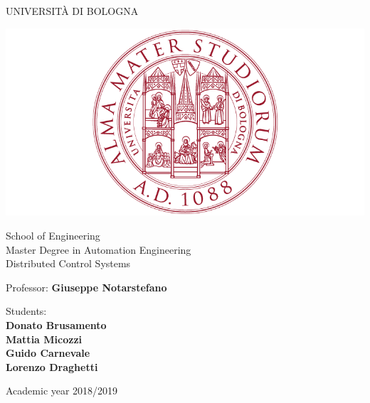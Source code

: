 \documentclass[a4paper,11pt,oneside]{book}
\begin{document}
	\pagestyle{myheadings}
	
	\thispagestyle{empty}                                                 
	\begin{center}                                                            
		\vspace{5mm}
		{\LARGE UNIVERSIT\`A DI BOLOGNA} \\                       
		\vspace{5mm}
	\end{center}
	\begin{center}
		\includegraphics[scale=.27]{figs/logo_unibo}
	\end{center}
	\begin{center}
		\vspace{5mm}
		{\LARGE School of Engineering} \\
		\vspace{3mm}
		{\Large Master Degree in Automation Engineering} \\
		\vspace{20mm}
		{\LARGE Distributed Control Systems} \\
		\vspace{15mm}
	\end{center}
	\begin{flushleft}                                                                              
		{\large Professor: \textbf{\@ Giuseppe Notarstefano}} \\        
		\vspace{13mm}
	\end{flushleft}
	\begin{flushright}
		{\large Students:\\
			\textbf{Donato Brusamento\\
				Mattia Micozzi\\
				Guido Carnevale\\
				Lorenzo Draghetti}}\\
	\end{flushright}        %
	\begin{center}
		\vfill
		{\large Academic year \@2018/2019} \\
	\end{center}
	
\end{document}
